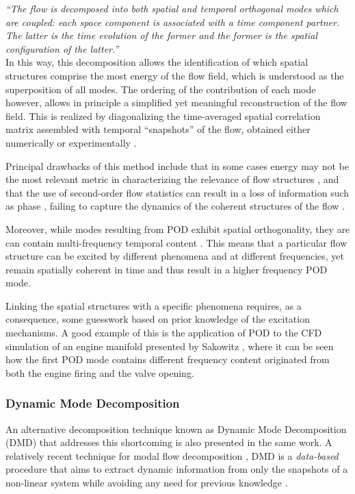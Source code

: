 \emph{``The flow is decomposed into both spatial and temporal orthogonal modes which are coupled: each space component is associated with a time component partner. The latter is the time evolution of the former and the former is the spatial configuration of the latter.''}\\

In this way, this decomposition allows the identification of which spatial structures comprise the most energy of the flow field, which is understood as the superposition of all modes. The ordering of the contribution of each mode however, allows in principle a simplified yet meaningful reconstruction of the flow field. This is realized by diagonalizing the time-averaged spatial correlation matrix assembled with temporal ``snapshots'' of the flow, obtained either numerically or experimentally \cite{schmid2010dynamic,bagheri2013koopman}.

Principal drawbacks of this method include that in some cases energy may not be the most relevant metric in characterizing the relevance of flow structures \cite{schmid2010dynamic}, and that the use of second-order flow statistics can result in a loss of information such as phase \cite{aubry1991hidden}, failing to capture the dynamics of the coherent structures of the flow \cite{schmid2011applications}.

Moreover, while modes resulting from POD exhibit spatial orthogonality, they are can contain multi-frequency temporal content \cite{jovanovic2014sparsity,sakowitz2014flow}. This means that a particular flow structure can be excited by different phenomena and at different frequencies, yet remain spatially coherent in time and thus result in a higher frequency POD mode. 

Linking the spatial structures with a specific phenomena requires, as a consequence, some guesswork based on prior knowledge of the excitation mechanisms. A good example of this is the application of POD to the CFD simulation of an engine manifold presented by Sakowitz \cite{sakowitz2014flow}, where it can be seen how the first POD mode contains different frequency content originated from both the engine firing and the valve opening.

\subsubsection{Dynamic Mode Decomposition}

An alternative decomposition technique known as Dynamic Mode Decomposition (DMD) that addresses this shortcoming is also presented in the same work. A relatively recent technique for modal flow decomposition \cite{rowley2009spectral,schmid2010dynamic,chen2012variants}, DMD is a \textit{data-based} procedure that aims to extract dynamic information from only the snapshots of a non-linear system while avoiding any need for previous knowledge \cite{schmid2010dynamic}. 

